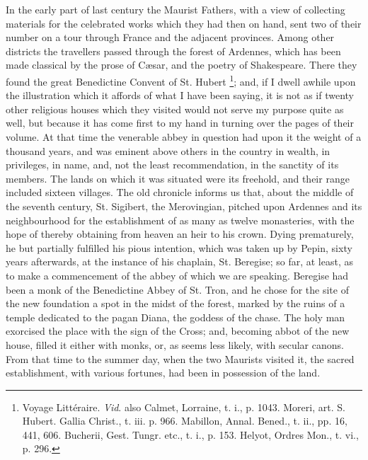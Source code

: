 In the early part of last century the Maurist Fathers, with a view
of collecting materials for the celebrated works which they had then
on hand, sent two of their number on a tour through France and the
adjacent provinces. Among other districts the travellers passed
through the forest of Ardennes, which has been made classical by the
prose of Cæsar, and the poetry of Shakespeare. There they found the
great Benedictine Convent of St. Hubert \footnote{Voyage
Littéraire. \emph{Vid}. also Calmet, Lorraine, t. i., p. 1043. Moreri,
art. S. Hubert. Gallia Christ., t. iii. p. 966. Mabillon, Annal. Bened.,
t. ii., pp. 16, 441, 606. Bucherii, Gest. Tungr. etc., t. i., p. 153.
Helyot, Ordres Mon., t. vi., p. 296.}; and, if I dwell awhile upon the illustration which it affords
of what I have been saying, it is not as if twenty other religious
houses which they visited would not serve my purpose quite as well,
but because it has come first to my hand in turning over the pages of
their volume. At that time the venerable abbey in question had upon it
the weight of a thousand years, and was eminent above others in the
country in wealth, in privileges, in name, and, not the least
recommendation, in the sanctity of its members. The lands on which it
was situated were its freehold, and their range included sixteen
villages. The old chronicle informs us that, about the middle of the
seventh century, St. Sigibert, the Merovingian, pitched upon
Ardennes and its neighbourhood for the establishment of as many as
twelve monasteries, with the hope of thereby obtaining from heaven an
heir to his crown. Dying prematurely, he but partially fulfilled his
pious intention, which was taken up by Pepin, sixty years afterwards,
at the instance of his chaplain, St. Beregise; so far, at least, as to
make a commencement of the abbey of which we are speaking. Beregise
had been a monk of the Benedictine Abbey of St. Tron, and he chose for
the site of the new foundation a spot in the midst of the forest,
marked by the ruins of a temple dedicated to the pagan Diana, the
goddess of the chase. The holy man exorcised the place with the sign
of the Cross; and, becoming abbot of the new house, filled it either
with monks, or, as seems less likely, with secular canons. From that
time to the summer day, when the two Maurists visited it, the sacred
establishment, with various fortunes, had been in possession of the
land.


